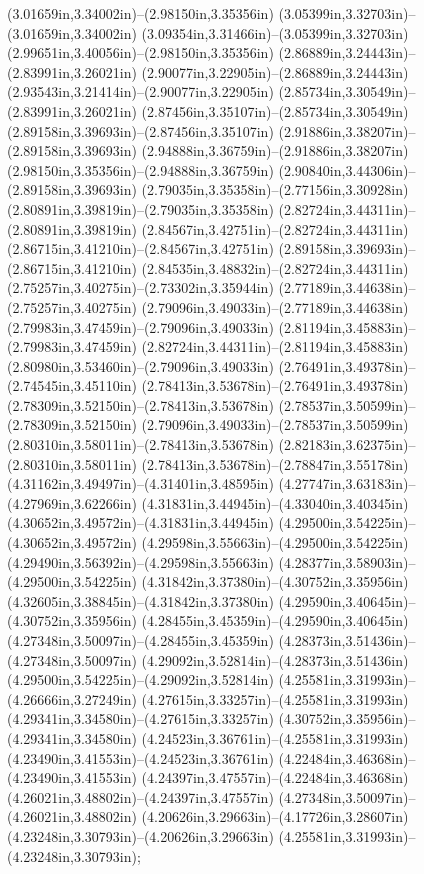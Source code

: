 (3.01659in,3.34002in)--(2.98150in,3.35356in) (3.05399in,3.32703in)--(3.01659in,3.34002in) (3.09354in,3.31466in)--(3.05399in,3.32703in) (2.99651in,3.40056in)--(2.98150in,3.35356in) (2.86889in,3.24443in)--(2.83991in,3.26021in) (2.90077in,3.22905in)--(2.86889in,3.24443in) (2.93543in,3.21414in)--(2.90077in,3.22905in) (2.85734in,3.30549in)--(2.83991in,3.26021in) (2.87456in,3.35107in)--(2.85734in,3.30549in) (2.89158in,3.39693in)--(2.87456in,3.35107in) (2.91886in,3.38207in)--(2.89158in,3.39693in) (2.94888in,3.36759in)--(2.91886in,3.38207in) (2.98150in,3.35356in)--(2.94888in,3.36759in) (2.90840in,3.44306in)--(2.89158in,3.39693in) (2.79035in,3.35358in)--(2.77156in,3.30928in) (2.80891in,3.39819in)--(2.79035in,3.35358in) (2.82724in,3.44311in)--(2.80891in,3.39819in) (2.84567in,3.42751in)--(2.82724in,3.44311in) (2.86715in,3.41210in)--(2.84567in,3.42751in) (2.89158in,3.39693in)--(2.86715in,3.41210in) (2.84535in,3.48832in)--(2.82724in,3.44311in) (2.75257in,3.40275in)--(2.73302in,3.35944in) (2.77189in,3.44638in)--(2.75257in,3.40275in) (2.79096in,3.49033in)--(2.77189in,3.44638in) (2.79983in,3.47459in)--(2.79096in,3.49033in) (2.81194in,3.45883in)--(2.79983in,3.47459in) (2.82724in,3.44311in)--(2.81194in,3.45883in) (2.80980in,3.53460in)--(2.79096in,3.49033in) (2.76491in,3.49378in)--(2.74545in,3.45110in) (2.78413in,3.53678in)--(2.76491in,3.49378in) (2.78309in,3.52150in)--(2.78413in,3.53678in) (2.78537in,3.50599in)--(2.78309in,3.52150in) (2.79096in,3.49033in)--(2.78537in,3.50599in) (2.80310in,3.58011in)--(2.78413in,3.53678in) (2.82183in,3.62375in)--(2.80310in,3.58011in) (2.78413in,3.53678in)--(2.78847in,3.55178in) (4.31162in,3.49497in)--(4.31401in,3.48595in) (4.27747in,3.63183in)--(4.27969in,3.62266in) (4.31831in,3.44945in)--(4.33040in,3.40345in) (4.30652in,3.49572in)--(4.31831in,3.44945in) (4.29500in,3.54225in)--(4.30652in,3.49572in) (4.29598in,3.55663in)--(4.29500in,3.54225in) (4.29490in,3.56392in)--(4.29598in,3.55663in) (4.28377in,3.58903in)--(4.29500in,3.54225in) (4.31842in,3.37380in)--(4.30752in,3.35956in) (4.32605in,3.38845in)--(4.31842in,3.37380in) (4.29590in,3.40645in)--(4.30752in,3.35956in) (4.28455in,3.45359in)--(4.29590in,3.40645in) (4.27348in,3.50097in)--(4.28455in,3.45359in) (4.28373in,3.51436in)--(4.27348in,3.50097in) (4.29092in,3.52814in)--(4.28373in,3.51436in) (4.29500in,3.54225in)--(4.29092in,3.52814in) (4.25581in,3.31993in)--(4.26666in,3.27249in) (4.27615in,3.33257in)--(4.25581in,3.31993in) (4.29341in,3.34580in)--(4.27615in,3.33257in) (4.30752in,3.35956in)--(4.29341in,3.34580in) (4.24523in,3.36761in)--(4.25581in,3.31993in) (4.23490in,3.41553in)--(4.24523in,3.36761in) (4.22484in,3.46368in)--(4.23490in,3.41553in) (4.24397in,3.47557in)--(4.22484in,3.46368in) (4.26021in,3.48802in)--(4.24397in,3.47557in) (4.27348in,3.50097in)--(4.26021in,3.48802in) (4.20626in,3.29663in)--(4.17726in,3.28607in) (4.23248in,3.30793in)--(4.20626in,3.29663in) (4.25581in,3.31993in)--(4.23248in,3.30793in);
